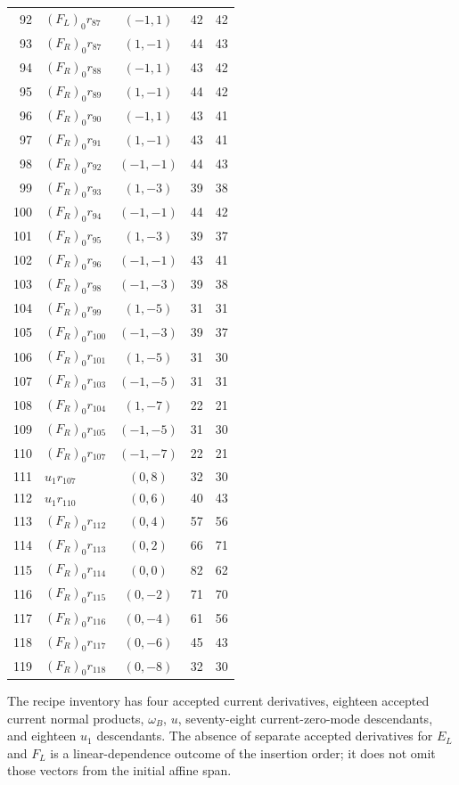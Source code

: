 \begin{longtable}{@{}rlcrr@{}}
92 & $(F_L)_0r_{87}$ & $(-1,1)$ & 42 & 42\\
93 & $(F_R)_0r_{87}$ & $(1,-1)$ & 44 & 43\\
94 & $(F_R)_0r_{88}$ & $(-1,1)$ & 43 & 42\\
95 & $(F_R)_0r_{89}$ & $(1,-1)$ & 44 & 42\\
96 & $(F_R)_0r_{90}$ & $(-1,1)$ & 43 & 41\\
97 & $(F_R)_0r_{91}$ & $(1,-1)$ & 43 & 41\\
98 & $(F_R)_0r_{92}$ & $(-1,-1)$ & 44 & 43\\
99 & $(F_R)_0r_{93}$ & $(1,-3)$ & 39 & 38\\
100 & $(F_R)_0r_{94}$ & $(-1,-1)$ & 44 & 42\\
101 & $(F_R)_0r_{95}$ & $(1,-3)$ & 39 & 37\\
102 & $(F_R)_0r_{96}$ & $(-1,-1)$ & 43 & 41\\
103 & $(F_R)_0r_{98}$ & $(-1,-3)$ & 39 & 38\\
104 & $(F_R)_0r_{99}$ & $(1,-5)$ & 31 & 31\\
105 & $(F_R)_0r_{100}$ & $(-1,-3)$ & 39 & 37\\
106 & $(F_R)_0r_{101}$ & $(1,-5)$ & 31 & 30\\
107 & $(F_R)_0r_{103}$ & $(-1,-5)$ & 31 & 31\\
108 & $(F_R)_0r_{104}$ & $(1,-7)$ & 22 & 21\\
109 & $(F_R)_0r_{105}$ & $(-1,-5)$ & 31 & 30\\
110 & $(F_R)_0r_{107}$ & $(-1,-7)$ & 22 & 21\\
111 & $u_1r_{107}$ & $(0,8)$ & 32 & 30\\
112 & $u_1r_{110}$ & $(0,6)$ & 40 & 43\\
113 & $(F_R)_0r_{112}$ & $(0,4)$ & 57 & 56\\
114 & $(F_R)_0r_{113}$ & $(0,2)$ & 66 & 71\\
115 & $(F_R)_0r_{114}$ & $(0,0)$ & 82 & 62\\
116 & $(F_R)_0r_{115}$ & $(0,-2)$ & 71 & 70\\
117 & $(F_R)_0r_{116}$ & $(0,-4)$ & 61 & 56\\
118 & $(F_R)_0r_{117}$ & $(0,-6)$ & 45 & 43\\
119 & $(F_R)_0r_{118}$ & $(0,-8)$ & 32 & 30\\
\end{longtable}
\endgroup
The recipe inventory has four accepted current derivatives, eighteen
accepted current normal products, $\omega_B$, $u$, seventy-eight
current-zero-mode descendants, and eighteen $u_1$ descendants. The
absence of separate accepted derivatives for $E_L$ and $F_L$ is a
linear-dependence outcome of the insertion order; it does not omit
those vectors from the initial affine span.


